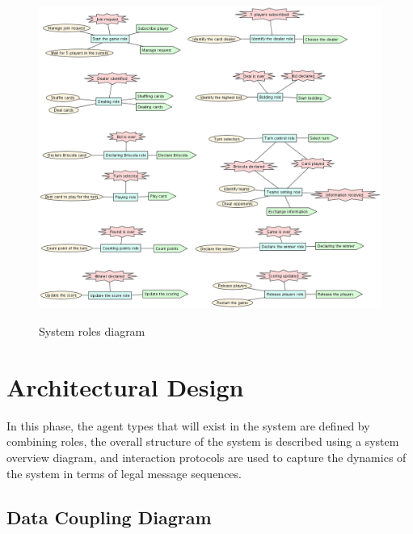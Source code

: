 \documentclass[a4paper]{article}
\begin{document}
\begin{figure}[htp]
  \centering
  \includegraphics[keepaspectratio,scale=0.4]{pdt/images/system_specification/system_roles.png}
  \label{fig:sysroles}
  \caption{System roles diagram}
\end{figure}

\newpage 

\section{Architectural Design}\label{sec:highdesign}

In this phase, the agent types that will exist in the system are defined by combining roles, the overall structure of the system is described using a system overview diagram, and interaction protocols are used to capture the dynamics of the system in terms of legal message sequences.

\subsection{Data Coupling Diagram}
\end{document}
